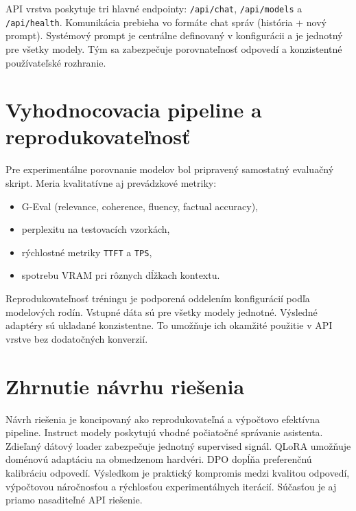 API vrstva poskytuje tri hlavné endpointy: \texttt{/api/chat}, \texttt{/api/models} a \texttt{/api/health}. Komunikácia prebieha vo formáte chat správ (história + nový prompt). Systémový prompt je centrálne definovaný v konfigurácii a je jednotný pre všetky modely. Tým sa zabezpečuje porovnateľnosť odpovedí a konzistentné používateľské rozhranie.

\section{Vyhodnocovacia pipeline a reprodukovateľnosť}

Pre experimentálne porovnanie modelov bol pripravený samostatný evaluačný skript. Meria kvalitatívne aj prevádzkové metriky:
\begin{itemize}
    \item G-Eval (relevance, coherence, fluency, factual accuracy),
    \item perplexitu na testovacích vzorkách,
    \item rýchlostné metriky \texttt{TTFT} a \texttt{TPS},
    \item spotrebu VRAM pri rôznych dĺžkach kontextu.
\end{itemize}

Reprodukovateľnosť tréningu je podporená oddelením konfigurácií podľa modelových rodín. Vstupné dáta sú pre všetky modely jednotné. Výsledné adaptéry sú ukladané konzistentne. To umožňuje ich okamžité použitie v API vrstve bez dodatočných konverzií.

\section{Zhrnutie návrhu riešenia}

Návrh riešenia je koncipovaný ako reprodukovateľná a výpočtovo efektívna pipeline. Instruct modely poskytujú vhodné počiatočné správanie asistenta. Zdieľaný dátový loader zabezpečuje jednotný supervised signál. QLoRA umožňuje doménovú adaptáciu na obmedzenom hardvéri. DPO dopĺňa preferenčnú kalibráciu odpovedí. Výsledkom je praktický kompromis medzi kvalitou odpovedí, výpočtovou náročnosťou a rýchlosťou experimentálnych iterácií. Súčasťou je aj priamo nasaditeľné API riešenie.
